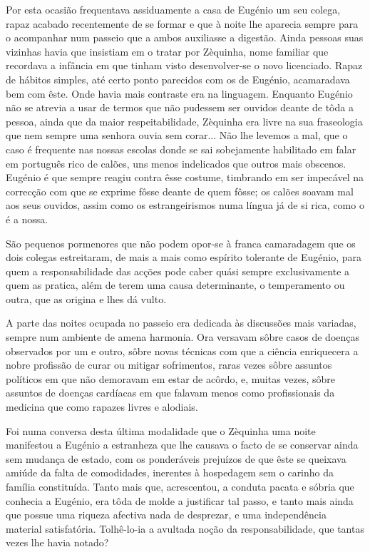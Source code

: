 \documentclass[9pt]{article}
\begin{document}
Por esta ocasião frequentava assiduamente a casa de Eugé\-nio um seu colega, rapaz acabado recentemente de se formar e que à noite lhe aparecia sempre
para o acompanhar num passeio que a ambos auxiliasse a digestão. Ainda pessoas
suas vizinhas havia que insistiam em o tratar por Zèquinha, nome familiar que
recordava a infância em que tinham visto desenvolver-se o novo licenciado.
Rapaz de hábitos simples, até certo ponto parecidos com os de Eugé\-nio, acamaradava bem com êste. Onde havia mais contraste era na linguagem. Enquanto
Eugé\-nio não se atrevia a usar de termos que não pudessem ser ouvidos deante
de tôda a pessoa, ainda que da maior respeitabilidade, Zèquinha era livre na
sua fraseologia que nem sempre uma senhora ouvia sem corar... Não lhe levemos
a mal, que o caso é frequente nas nossas escolas donde se sai sobejamente habilitado em falar em por\-tu\-guês rico de calões, uns menos indelicados que outros mais obscenos. Eugé\-nio é que sempre reagiu contra êsse costume, timbrando em ser impecável na correc\-ção com que se exprime fôsse deante de quem fôsse; os calões soavam mal aos seus ouvidos, assim como os estrangeirismos numa língua já de si rica, como o é a nossa.

São pequenos pormenores que não podem opor-se à franca camaradagem que
os dois colegas estreitaram, de mais a mais como espírito tolerante de Eugé\-nio, para quem a responsabilidade das ac\-ções pode caber quási sempre exclusivamente a quem as pratica, além de terem uma causa determinante, o temperamento ou outra, que as origina e lhes dá vulto.

A parte das noites ocupada no passeio era dedicada às discussões mais
variadas, sempre num ambiente de amena harmonia. Ora versavam sôbre casos de
doenças observados por um e outro, sôbre novas técnicas com que a ciência enrique\-cera a nobre profissão de curar ou mitigar sofrimentos, raras vezes sôbre assuntos políticos em que não demoravam em estar de acôrdo, e, muitas vezes, sôbre assuntos de doenças cardíacas em que falavam menos como profissionais da medicina que como rapazes livres e alodiais.

Foi numa conversa desta última modalidade que o Zèquinha uma noite manifestou a Eugé\-nio a estranheza que lhe causava o facto de se conservar ainda sem mudan\-ça de estado, com os ponderáveis prejuízos de que êste se queixava amiúde da falta de comodidades, inerentes à hospedagem sem o carinho da fa\-mí\-lia constituída. Tanto mais que, a\-cres\-centou, a conduta pacata e sóbria que
conhecia a Eugé\-nio, era tôda de molde a justifi\-car tal passo, e tanto mais ainda que possue uma riqueza afectiva nada de desprezar, e uma independên\-cia material satisfatória. To\-lhê-lo-ia a avultada no\-ção da responsabilidade, que
tantas vezes lhe havia notado?
\end{document}
